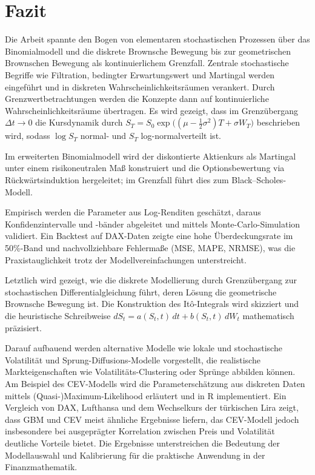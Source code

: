 \section{Fazit}

Die Arbeit spannte den Bogen von elementaren stochastischen Prozessen über das Binomialmodell und die diskrete Brownsche 
Bewegung bis zur geometrischen Brownschen Bewegung als kontinuierlichem Grenzfall. Zentrale stochastische Begriffe wie 
Filtration, bedingter Erwartungswert und Martingal werden eingeführt und in diskreten Wahrscheinlichkeitsräumen verankert. 
Durch Grenzwertbetrachtungen werden die Konzepte dann auf kontinuierliche Wahrscheinlichkeitsräume übertragen. Es wird gezeigt, dass im Grenzübergang $\Delta t \to 0$ die Kursdynamik durch
$S_T = S_0 \exp\!\big((\mu - \tfrac12\sigma^2)T + \sigma W_T\big)$
beschrieben wird, sodass $\log S_T$ normal- und $S_T$ log-normalverteilt ist. 

Im erweiterten Binomialmodell wird der diskontierte Aktienkurs als Martingal unter einem risikoneutralen Maß konstruiert und die Optionsbewertung 
via Rückwärtsinduktion hergeleitet; im Grenzfall führt dies zum Black–Scholes-Modell.

Empirisch werden die Parameter aus 
Log-Renditen geschätzt, daraus Konfidenzintervalle und -bänder abgeleitet und mittels Monte-Carlo-Simulation validiert. 
Ein Backtest auf DAX-Daten zeigte eine hohe Überdeckungsrate im 50\%-Band und nachvollziehbare Fehlermaße (MSE, MAPE, NRMSE), 
was die Praxistauglichkeit trotz der Modellvereinfachungen unterstreicht. 

Letztlich wird gezeigt, wie die diskrete Modellierung durch Grenzübergang zur stochastischen Differentialgleichung führt, deren Lösung die 
geometrische Brownsche Bewegung ist. Die Konstruktion des Itô-Integrals wird skizziert und die 
heuristische Schreibweise $dS_t = a(S_t,t)\,dt + b(S_t,t)\,dW_t$ mathematisch präzisiert.

Darauf aufbauend werden alternative Modelle wie lokale und stochastische Volatilität und Sprung-Diffusions-Modelle vorgestellt, die realistische Markteigenschaften wie Volatilitäts-Clustering oder Sprünge abbilden können. 
Am Beispiel des CEV-Modells wird die Parameterschätzung aus diskreten Daten mittels (Quasi-)Maximum-Likelihood 
erläutert und in R implementiert. Ein Vergleich von DAX, Lufthansa und dem Wechselkurs der türkischen Lira zeigt, dass GBM und CEV meist ähnliche Ergebnisse liefern, das CEV-Modell jedoch insbesondere bei ausgeprägter Korrelation zwischen Preis und Volatilität deutliche Vorteile bietet. Die Ergebnisse unterstreichen die Bedeutung der
 Modellauswahl und Kalibrierung für die praktische Anwendung in der Finanzmathematik.


